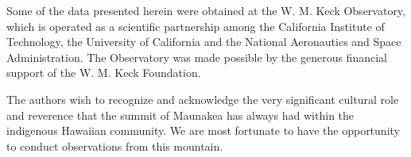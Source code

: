 \documentclass[preprint2]{aastex61}
\begin{document}
Some of the data presented herein were obtained at the W. M. Keck Observatory, which is operated as a scientific partnership among the California Institute of Technology, the University of California and the National Aeronautics and Space Administration. The Observatory was made possible by the generous financial support of the W. M. Keck Foundation. 

The authors wish to recognize and acknowledge the very significant cultural role and reverence that the summit of Maunakea has always had within the indigenous Hawaiian community.  We are most fortunate to have the opportunity to conduct observations from this mountain.



\end{document}
